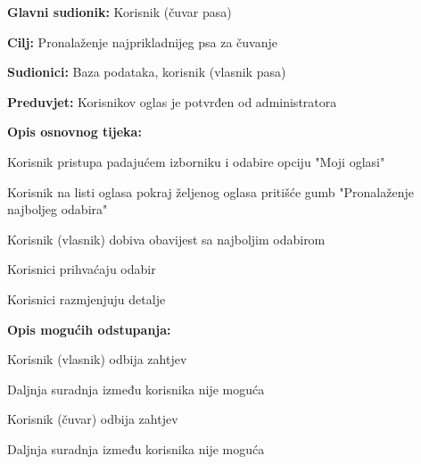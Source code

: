 					\noindent {}
					\begin{packed_item}
						
						\item \textbf{Glavni sudionik: } Korisnik (čuvar pasa)
						\item  \textbf{Cilj:} Pronalaženje najprikladnijeg psa za čuvanje
						\item  \textbf{Sudionici:} Baza podataka, korisnik (vlasnik pasa)
						\item  \textbf{Preduvjet:} Korisnikov oglas je potvrđen od administratora
						\item  \textbf{Opis osnovnog tijeka:}
						
						\item[] \begin{packed_enum}
							
							\item Korisnik pristupa padajućem izborniku i odabire opciju "Moji oglasi"    
							\item Korisnik na listi oglasa pokraj željenog oglasa pritišće gumb "Pronalaženje najboljeg odabira"  
							\item Korisnik (vlasnik) dobiva obavijest sa najboljim odabirom
							\item Korisnici prihvaćaju odabir
							\item Korisnici razmjenjuju detalje
							
						\end{packed_enum}
						
						\item  \textbf{Opis mogućih odstupanja:}
						
						\item[] \begin{packed_item}
							
							\item[4.a] Korisnik (vlasnik) odbija zahtjev
							\item[] \begin{packed_enum}
								
								\item Daljnja suradnja između korisnika nije moguća
								
							\end{packed_enum}
							\item[4.b] Korisnik (čuvar) odbija zahtjev
							\item[] \begin{packed_enum}
								
								\item Daljnja suradnja između korisnika nije moguća
								
							\end{packed_enum}
						\end{packed_item}
					\end{packed_item}	
				
